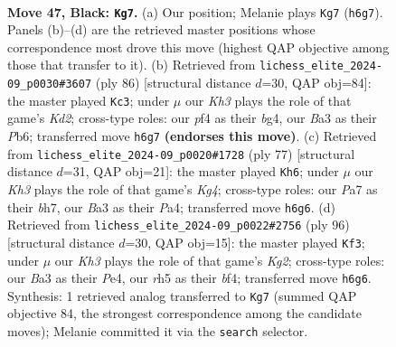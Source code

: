 \documentclass[11pt]{article}
\begin{document}
\clearpage

\begin{figure}[p]\centering
\begin{subfigure}{0.46\textwidth}\centering
\resizebox{\linewidth}{!}{%
\newchessgame
\chessboard[
  setfen={8/pp6/7k/7R/5P2/bq3BK1/8/8 b - - 0 47},
  showmover=false,
  pgfstyle=straightmove, color=movearrow, markmove={h6-g7}
]}
\caption{}
\end{subfigure}\hfill
\begin{subfigure}{0.46\textwidth}\centering
\resizebox{\linewidth}{!}{%
\newchessgame
\chessboard[
  setfen={8/8/1P1Qp1k1/4P1p1/6b1/8/3Kr3/8 w - - 1 44},
  showmover=false,
  pgfstyle=straightmove, color=movearrow, markmove={d2-c3}
]}
\caption{}
\end{subfigure}
\\[4pt]
\begin{subfigure}{0.46\textwidth}\centering
\resizebox{\linewidth}{!}{%
\newchessgame
\chessboard[
  setfen={8/7B/6p1/1R4k1/p7/6P1/q5PK/8 b - - 0 39},
  showmover=false,
  pgfstyle=straightmove, color=movearrow, markmove={g5-h6}
]}
\caption{}
\end{subfigure}\hfill
\begin{subfigure}{0.46\textwidth}\centering
\resizebox{\linewidth}{!}{%
\newchessgame
\chessboard[
  setfen={8/2r5/2P5/3Q2pk/4Pb2/8/6K1/8 w - - 19 49},
  showmover=false,
  pgfstyle=straightmove, color=movearrow, markmove={g2-f3}
]}
\caption{}
\end{subfigure}
\caption{\textbf{Move 47, Black: \texttt{Kg7}.} (a) Our position; Melanie plays \texttt{Kg7} (\texttt{h6g7}). Panels (b)--(d) are the retrieved master positions whose correspondence most drove this move (highest QAP objective among those that transfer to it). (b) Retrieved from \texttt{lichess\_elite\_2024-09\_p0030\#3607} (ply 86) [structural distance $d$=30, QAP obj=84]: the master played \texttt{Kc3}; under $\mu$ our \emph{Kh3} plays the role of that game's \emph{Kd2}; cross-type roles: our \emph{p}f4 as their \emph{b}g4, our \emph{B}a3 as their \emph{P}b6; transferred move \texttt{h6g7} \textbf{(endorses this move)}. (c) Retrieved from \texttt{lichess\_elite\_2024-09\_p0020\#1728} (ply 77) [structural distance $d$=31, QAP obj=21]: the master played \texttt{Kh6}; under $\mu$ our \emph{Kh3} plays the role of that game's \emph{Kg4}; cross-type roles: our \emph{P}a7 as their \emph{b}h7, our \emph{B}a3 as their \emph{P}a4; transferred move \texttt{h6g6}. (d) Retrieved from \texttt{lichess\_elite\_2024-09\_p0022\#2756} (ply 96) [structural distance $d$=30, QAP obj=15]: the master played \texttt{Kf3}; under $\mu$ our \emph{Kh3} plays the role of that game's \emph{Kg2}; cross-type roles: our \emph{B}a3 as their \emph{P}e4, our \emph{r}h5 as their \emph{b}f4; transferred move \texttt{h6g6}. Synthesis: 1 retrieved analog transferred to \texttt{Kg7} (summed QAP objective 84, the strongest correspondence among the candidate moves); Melanie committed it via the \texttt{search} selector.}
\label{fig:thought-m93}
\end{figure}
\end{document}
